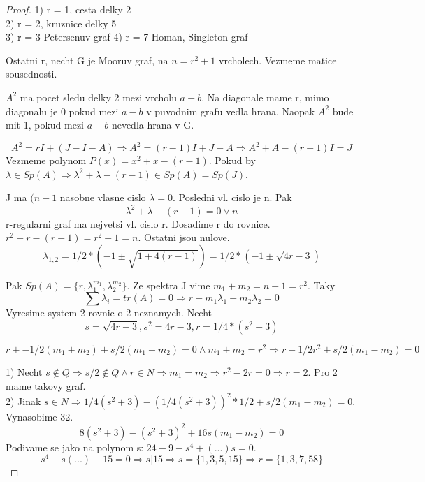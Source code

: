 \begin{proof}
	1) r = 1, cesta delky 2\\
	2) r = 2, kruznice delky 5\\
	3) r = 3 Petersenuv graf
	4) r = 7 Homan, Singleton graf

	Ostatni r, necht G je Mooruv graf, na $n = r^2 + 1$ vrcholech. Vezmeme matice sousednosti.

	$A^2$ ma pocet sledu delky 2 mezi vrcholu $a - b$. Na diagonale mame r, mimo diagonalu je 0 pokud mezi $a - b$ v puvodnim grafu vedla hrana. Naopak $A^2$ bude mit 1, pokud mezi $a - b$ nevedla hrana v G.

	\[A^2 = rI + (J - I - A) \Rightarrow A^2 = (r - 1) I + J - A \Rightarrow A^2 + A - (r - 1)I = J \]
	Vezmeme polynom $P(x) = x^2 + x - (r-1)$. Pokud by $\lambda \in Sp(A) \Rightarrow \lambda^2 + \lambda - (r - 1) \in Sp(A) = Sp(J)$.

	J ma $(n-1$ nasobne vlasne cislo $\lambda = 0$. Posledni vl. cislo je n. Pak
	\[ \lambda^2 + \lambda - (r - 1) = 0 \lor n \]
	r-regularni graf ma nejvetsi vl. cislo r. Dosadime r do rovnice. $ r^2 + r - (r - 1) = r^2 + 1 = n $.
	Ostatni jsou nulove.
	\[ \lambda_{1,2} = 1/2 * (-1 \pm \sqrt{1 + 4 (r-1)}) = 1/2 * (-1 \pm \sqrt{4r - 3}) \]

	Pak $ Sp(A) = \{ r, \lambda_1^{m_1}, \lambda_2^{m_2} \} $. Ze spektra J vime $m_1 + m_2 = n-1 = r^2$. Taky
	\[ \sum \lambda_i = tr(A) = 0 \Rightarrow r + m_1 \lambda_1 + m_2 \lambda_2 = 0 \]
	Vyresime system 2 rovnic o 2 neznamych. Necht
	\[s = \sqrt{4r - 3}, s^2 = 4r - 3, r = 1/4 * (s^2 + 3)\]

	\[ r + -1/2 (m_1 + m_2) + s/2 (m_1 - m_2) = 0 \land m_1 + m_2 = r^2 \Rightarrow r - 1/2 r^2 + s/2 (m_1 - m_2) = 0 \]

	1) Necht $s \notin Q \Rightarrow s/2 \notin Q \land r \in N \Rightarrow m_1 = m_2 \Rightarrow r^2 - 2r = 0 \Rightarrow r = 2$. Pro 2 mame takovy graf.\\
	2) Jinak $ s \in N \Rightarrow 1/4 (s^2 + 3) - (1/4 (s^2 + 3))^2 * 1/2 + s/2 (m_1 - m_2) = 0$. Vynasobime 32.
	\[ 8(s^2 + 3) - (s^2 + 3)^2 + 16s(m_1 - m_2) = 0 \]
	Podivame se jako na polynom s: $24 - 9 - s^4 + (...) s = 0$.
	\[ s^4 + s(...) - 15 = 0 \Rightarrow s | 15 \Rightarrow s = \{ 1, 3, 5, 15 \} \Rightarrow r = \{1, 3, 7, 58 \} \]
\end{proof}

